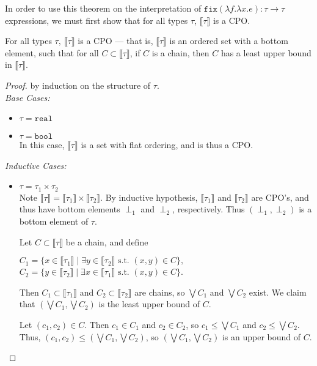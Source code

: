 In order to use this theorem on the interpretation of $\texttt{fix}(\lambda f. \lambda x.e): \tau \rightarrow \tau$ expressions, 
we must first show that for all types $\tau$, $\llbracket \tau \rrbracket$ is a CPO.
\begin{thm}
For all types $\tau, \ \llbracket \tau \rrbracket$ is a CPO --- that is, $\llbracket \tau \rrbracket$ is an ordered 
set with a bottom element, such that for all $ C \subset \llbracket \tau \rrbracket$, if  $C$ is a chain, then $C$ has a least 
upper bound in $\llbracket \tau \rrbracket$. 
\end{thm}
\begin{proof}
by induction on the structure of $\tau$. \\
\emph{Base Cases: }
\begin{itemize}
\item $\tau = \texttt{real}$
\item $\tau = \texttt{bool}$ \\
In this case, $\llbracket \tau \rrbracket$ is a set with flat ordering, and is thus a CPO. 
\end{itemize}
\emph{Inductive Cases: }
\begin{itemize}
\item $\tau = \tau_1 \times \tau_2$  \\
Note $\llbracket \tau \rrbracket = \llbracket \tau_1 \rrbracket \times \llbracket \tau_2 \rrbracket$. By inductive hypothesis,
$\llbracket \tau_1 \rrbracket$ and $\llbracket \tau_2 \rrbracket$ are CPO's, and thus have bottom elements $\perp_1$ and $
\perp_2$, respectively. Thus $(\perp_1, \perp_2)$ is a bottom element of $\tau$. 

Let $C \subset \llbracket \tau \rrbracket$ be a
chain, and define
\begin{center}
$C_1 = \{x \in \llbracket \tau_1 \rrbracket \mid \exists y \in \llbracket \tau_2 \rrbracket \text{ s.t. } (x,y) \in C\},$ \\
$C_2 = \{ y \in \llbracket \tau_2 \rrbracket\mid \exists x \in \llbracket \tau_1 \rrbracket \text{ s.t. } (x,y) \in C\}$. \\ 
\end{center}
Then $C_1 \subset \llbracket \tau_1 \rrbracket$ and $C_2 \subset \llbracket \tau_2 \rrbracket$ are chains, so $\bigvee C_1$
and $\bigvee C_2$ exist. We claim that $(\bigvee C_1, \bigvee C_2)$ is the least upper bound of $C$. 

Let $(c_1, c_2) \in C$. Then $c_1 \in C_1$ and $c_2 \in C_2$, so $c_1 \leq \bigvee C_1$ and $c_2 \leq \bigvee C_2$. Thus, 
$(c_1, c_2) \leq (\bigvee C_1, \bigvee C_2)$, so $(\bigvee C_1, \bigvee C_2)$ is an upper bound of $C$.


\end{itemize}
\end{proof}
